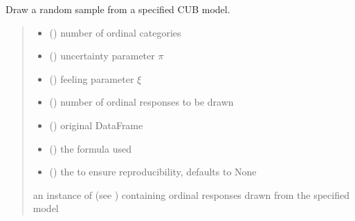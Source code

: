 \documentclass[letterpaper,10pt,english]{sphinxmanual}
\begin{document}
\begin{fulllineitems}
\label{\detokenize{cubmods:cubmods.cub.draw}}
\pysigstartsignatures
{}
\pysigstopsignatures
\sphinxAtStartPar
Draw a random sample from a specified CUB model.
\begin{quote}\begin{description}
\begin{itemize}
\item {} 
\sphinxAtStartPar
{} () \textendash{} number of ordinal categories

\item {} 
\sphinxAtStartPar
{} () \textendash{} uncertainty parameter \(\pi\)

\item {} 
\sphinxAtStartPar
{} () \textendash{} feeling parameter \(\xi\)

\item {} 
\sphinxAtStartPar
{} () \textendash{} number of ordinal responses to be drawn

\item {} 
\sphinxAtStartPar
{} () \textendash{} original DataFrame

\item {} 
\sphinxAtStartPar
{} () \textendash{} the formula used

\item {} 
\sphinxAtStartPar
{} (\sphinxstyleliteralemphasis{\sphinxupquote{, }}) \textendash{} the  to ensure reproducibility, defaults to None

\end{itemize}

\sphinxAtStartPar
an instance of  (see ) containing ordinal responses drawn from the specified model

\end{description}\end{quote}

\end{fulllineitems}
\end{document}
